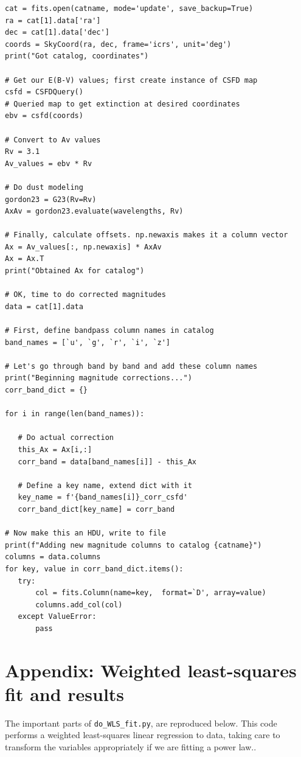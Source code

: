 \documentclass[11pt, oneside]{article}   	%
\begin{document}
\small
\begin{verbatim}
cat = fits.open(catname, mode='update', save_backup=True)
ra = cat[1].data['ra']
dec = cat[1].data['dec']
coords = SkyCoord(ra, dec, frame='icrs', unit='deg')
print("Got catalog, coordinates")

# Get our E(B-V) values; first create instance of CSFD map
csfd = CSFDQuery()
# Queried map to get extinction at desired coordinates
ebv = csfd(coords)

# Convert to Av values
Rv = 3.1
Av_values = ebv * Rv

# Do dust modeling
gordon23 = G23(Rv=Rv)
AxAv = gordon23.evaluate(wavelengths, Rv)

# Finally, calculate offsets. np.newaxis makes it a column vector
Ax = Av_values[:, np.newaxis] * AxAv
Ax = Ax.T 
print("Obtained Ax for catalog")

# OK, time to do corrected magnitudes
data = cat[1].data

# First, define bandpass column names in catalog
band_names = [`u', `g', `r', `i', `z']

# Let's go through band by band and add these column names
print("Beginning magnitude corrections...")
corr_band_dict = {}

for i in range(len(band_names)):

   # Do actual correction
   this_Ax = Ax[i,:]
   corr_band = data[band_names[i]] - this_Ax

   # Define a key name, extend dict with it
   key_name = f'{band_names[i]}_corr_csfd'
   corr_band_dict[key_name] = corr_band

# Now make this an HDU, write to file
print(f"Adding new magnitude columns to catalog {catname}")
columns = data.columns
for key, value in corr_band_dict.items():
   try:
       col = fits.Column(name=key,  format=`D', array=value)
       columns.add_col(col)
   except ValueError:
       pass

\end{verbatim}
\normalsize

\section{Appendix: Weighted least-squares fit and results}\label{appd:wls}

The important parts of \texttt{do\_WLS\_fit.py}, are reproduced below. 
This code performs a weighted least-squares linear regression to data, taking care to 
transform the variables appropriately if we are fitting a power law..
\end{document}
